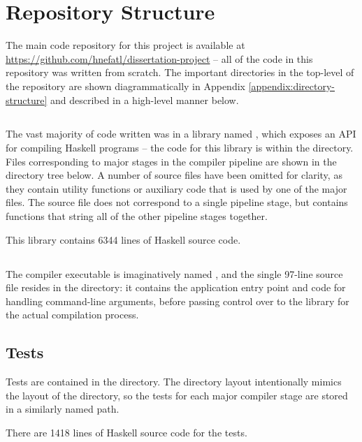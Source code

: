 \documentclass[dissertation.tex]{subfiles}
\begin{document}
\section{Repository Structure}
{
    The main code repository for this project is available at \url{https://github.com/hnefatl/dissertation-project} -- all of the code in this repository was written from scratch. The important directories in the top-level of the repository are shown diagrammatically in Appendix \ref{appendix:directory-structure} and described in a high-level manner below.

    \subsection{}
    {
        The vast majority of code written was in a library named , which exposes an API for compiling Haskell programs -- the code for this library is within the  directory. Files corresponding to major stages in the compiler pipeline are shown in the directory tree below. A number of source files have been omitted for clarity, as they contain utility functions or auxiliary code that is used by one of the major files. The  source file does not correspond to a single pipeline stage, but contains functions that string all of the other pipeline stages together.

        This library contains 6344 lines of Haskell source code.
    }
    \subsection{}
    {
        The compiler executable is imaginatively named , and the single 97-line source file  resides in the  directory: it contains the application entry point and code for handling command-line arguments, before passing control over to the  library for the actual compilation process.
    }
    \subsection{Tests}
    {
        Tests are contained in the  directory. The directory layout intentionally mimics the layout of the  directory, so the tests for each major compiler stage are stored in a similarly named path.

        There are 1418 lines of Haskell source code for the tests.
    }
}
\end{document}

